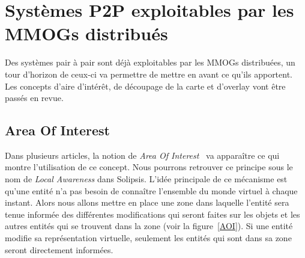 \section{Systèmes P2P exploitables par les MMOGs distribués}
	Des systèmes pair à pair sont déjà exploitables par les MMOGs distribuées, un tour d'horizon de ceux-ci va permettre de mettre en avant ce qu'ils apportent. Les concepts d'aire d'intérêt, de découpage de la carte et d'overlay vont être passés en revue.
	\subsection{Area Of Interest}
	Dans plusieurs articles, la notion de \textit{Area Of Interest}~\cite{1403002,1267692,1015507} va apparaître ce qui montre l'utilisation de ce concept. Nous pourrons retrouver ce principe sous le nom de \textit{Local Awareness} dans Solipsis. L'idée principale de ce mécanisme est qu'une entité n'a pas besoin de connaître l'ensemble du monde virtuel à chaque instant. Alors nous allons mettre en place une zone dans laquelle l'entité sera tenue informée des différentes modifications qui seront faites sur les objets et les autres entités qui se trouvent dans la zone (voir la figure~\ref{AOI}). Si une entité modifie sa représentation virtuelle, seulement les entités qui sont dans sa zone seront directement informées.\\

